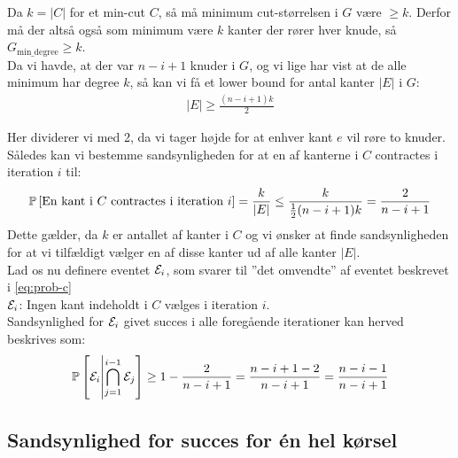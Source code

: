Da $k = |C|$ for et min-cut $C$, så må minimum cut-størrelsen i $G$ være $\geq k$. Derfor må der altså også som minimum være $k$ kanter der rører hver knude, så $G_{\text{min\_degree}} \geq k$.\\

Da vi havde, at der var $n-i+1$ knuder i $G$, og vi lige har vist at de alle minimum har degree $k$, så kan vi få et lower bound for antal kanter $|E|$ i $G$:
\begin{align*}
  |E| \geq \frac{(n-i+1)k}{2}
\end{align*}

Her dividerer vi med 2, da vi tager højde for at enhver kant $e$ vil røre to knuder.\\

Således kan vi bestemme sandsynligheden for at en af kanterne i $C$ contractes i iteration $i$ til:
\begin{align} \label{eq:prob-c}
  \P{\text{En kant i $C$ contractes i iteration $i$}} = \frac{k}{|E|} \leq \frac{k}{\frac{1}{2}(n-i+1)k} = \frac{2}{n-i+1}
\end{align}
Dette gælder, da $k$ er antallet af kanter i $C$ og vi ønsker at finde sandsynligheden for at vi tilfældigt vælger en af disse kanter ud af alle kanter $|E|$.\\

Lad os nu definere eventet $\event_i$, som svarer til ''det omvendte'' af eventet beskrevet i \cref{eq:prob-c}\\
$\event_i$: Ingen kant indeholdt i $C$ vælges i iteration $i$.\\

Sandsynlighed for $\event_i$ givet succes i alle foregående iterationer kan herved beskrives som:
\begin{align} \label{eq:prob-succes-given-former-succes}
  \P{ \event_i \middle| \bigcap_{j=1}^{i-1} \event_j} \geq 1 - \frac{2}{n-i+1} = \frac{n-i+1-2}{n-i+1} = \frac{n-i-1}{n-i+1}
\end{align}



\subsection{Sandsynlighed for succes for én hel kørsel}

